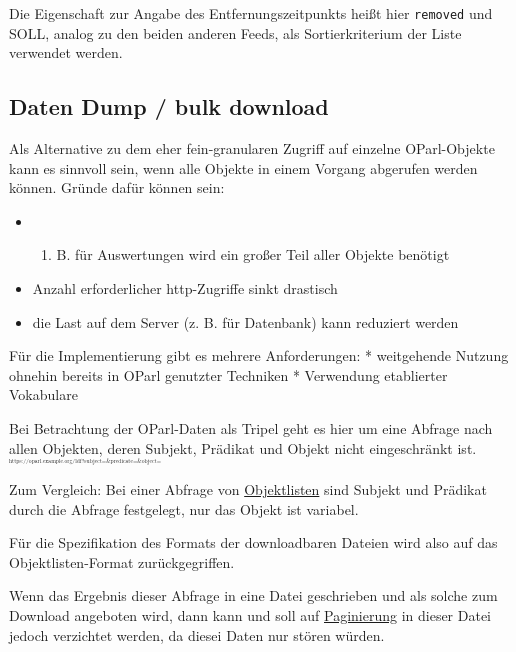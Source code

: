 \documentclass[,a4paper]{article}
\begin{document}
Die Eigenschaft zur Angabe des Entfernungszeitpunkts heißt hier
\texttt{removed} und SOLL, analog zu den beiden anderen Feeds, als
Sortierkriterium der Liste verwendet werden.

\subsection{Daten Dump / bulk download}\label{daten-dump-bulk-download}

Als Alternative zu dem eher fein-granularen Zugriff auf einzelne
OParl-Objekte kann es sinnvoll sein, wenn alle Objekte in einem Vorgang
abgerufen werden können. Gründe dafür können sein:

\begin{itemize}
\item
  \begin{enumerate}
  \def\labelenumi{\alph{enumi}.}
  \setcounter{enumi}{25}
  \itemsep1pt\parskip0pt
  \item
    B. für Auswertungen wird ein großer Teil aller Objekte benötigt
  \end{enumerate}
\item
  Anzahl erforderlicher http-Zugriffe sinkt drastisch
\item
  die Last auf dem Server (z. B. für Datenbank) kann reduziert werden
\end{itemize}

Für die Implementierung gibt es mehrere Anforderungen: * weitgehende
Nutzung ohnehin bereits in OParl genutzter Techniken * Verwendung
etablierter Vokabulare

Bei Betrachtung der OParl-Daten als Tripel geht es hier um eine Abfrage
nach allen Objekten, deren Subjekt, Prädikat und Objekt nicht
eingeschränkt ist.
\textsubscript{\textsubscript{\textsubscript{\textsubscript{\textsubscript{
https://oparl.example.org/ldf?subject=\&predicate=\&object= }}}}}

Zum Vergleich: Bei einer Abfrage von
\hyperref[objektlisten]{Objektlisten} sind Subjekt und Prädikat durch
die Abfrage festgelegt, nur das Objekt ist variabel.

Für die Spezifikation des Formats der downloadbaren Dateien wird also
auf das Objektlisten-Format zurückgegriffen.

Wenn das Ergebnis dieser Abfrage in eine Datei geschrieben und als
solche zum Download angeboten wird, dann kann und soll auf
\hyperref[paginierung]{Paginierung} in dieser Datei jedoch verzichtet
werden, da diesei Daten nur stören würden.
\end{document}
